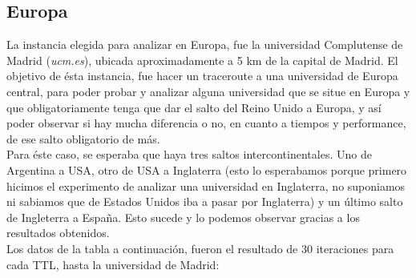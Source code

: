 
\subsection{Europa}

La instancia elegida para analizar en Europa, fue la universidad Complutense de Madrid (\textit{ucm.es}), ubicada aproximadamente a
5 km de la capital de Madrid. El objetivo de ésta instancia, fue hacer un traceroute a una universidad de Europa central, para poder 
probar y analizar alguna universidad que se situe en Europa y que obligatoriamente tenga que dar el salto del Reino Unido a Europa, 
y así poder observar si hay mucha diferencia o no, en cuanto a tiempos y performance, de ese salto obligatorio de más. \\

Para éste caso, se esperaba que haya tres saltos intercontinentales. Uno de Argentina a USA, otro de USA a Inglaterra (esto lo esperabamos
porque primero hicimos el experimento de analizar una universidad en Inglaterra, no suponiamos ni sabiamos que de Estados Unidos iba a pasar
por Inglaterra) y un último salto de Ingleterra a España. Esto sucede y lo podemos observar gracias a los resultados obtenidos. \\

Los datos de la tabla a continuación, fueron el resultado de 30 iteraciones para cada TTL, hasta la universidad de Madrid: \\


